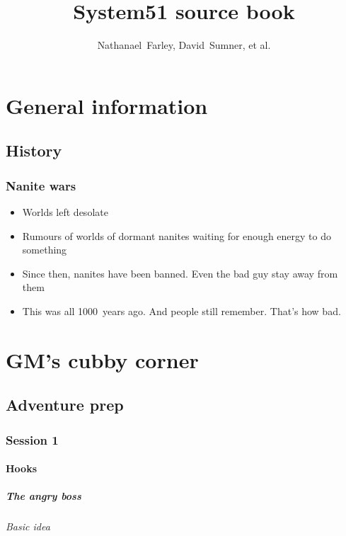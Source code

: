 \documentclass[a4paper,twocolumn,oneside]{memoir}
\title{System51 source book}
\author{Nathanael~Farley, David~Sumner, et al.}
\begin{document}
\part{General information}
\label{part:general-information}

\chapter{History}
\label{cha:history}

\section{Nanite wars}
\label{sec:nanite-wars}

\begin{itemize}
\item Worlds left desolate
\item Rumours of worlds of dormant nanites waiting for enough energy to do
  something
\item Since then, nanites have been banned. Even the bad guy stay away from them
\item This was all 1000~years ago. And people still remember. That's how bad.
\end{itemize}

\part{GM's cubby corner}
\label{part:gms-cubby-corner}


\chapter{Adventure prep}
\label{cha:adventure-prep}

\section{Session 1}

\subsection{Hooks}
\label{sec:hooks}

\subsubsection{The angry boss}
\label{sec:angry-boss}

\paragraph{Basic idea}
\end{document}
